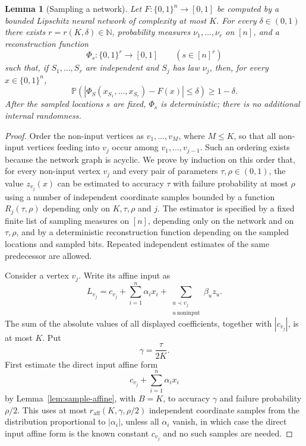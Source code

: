 \documentclass[11pt]{amsart}
\newtheorem{lemma}[theorem]{Lemma}
\newcommand{\Pp}{\mathbb P}
\newcommand{\N}{\mathbb N}
\newcommand{\1}{\mathbf 1}
\newcommand{\cube}{\{0,1\}}
\newcommand{\abs}[1]{\left\lvert #1\right\rvert}
\begin{document}
\begin{lemma}[Sampling a network]\label{lem:sample-network}
Let $F:\cube^n\to[0,1]$ be computed by a bounded Lipschitz neural network of complexity at most $K$.  For every $\delta\in(0,1)$ there exists $r=r(K,\delta)\in\N$, probability measures $\nu_1,\ldots,\nu_r$ on $[n]$, and a reconstruction function
\[
        \Phi_s:\cube^r\to[0,1]\qquad (s\in[n]^r)
\]
such that, if $S_1,\ldots,S_r$ are independent and $S_j$ has law $\nu_j$, then, for every $x\in\cube^n$,
\[
        \Pp\left(\abs{\Phi_S(x_{S_1},\ldots,x_{S_r})-F(x)}\leq\delta\right)\geq1-\delta .
\]
After the sampled locations $s$ are fixed, $\Phi_s$ is deterministic; there is no additional internal randomness.
\end{lemma}

\begin{proof}
Order the non-input vertices as \(v_1,\ldots,v_M\), where \(M\leq K\), so that
all non-input vertices feeding into \(v_j\) occur among
\(v_1,\ldots,v_{j-1}\).  Such an ordering exists because the network graph is
acyclic. We prove by induction on this order that, for every non-input vertex $v_j$ and every pair of parameters $\tau,\rho\in(0,1)$, the value $z_{v_j}(x)$ can be estimated to accuracy $\tau$ with failure probability at most $\rho$ using a number of independent coordinate samples bounded by a function $R_j(\tau,\rho)$ depending only on $K,\tau,\rho$ and $j$.  The estimator is specified by a fixed finite list of sampling measures on $[n]$, depending only on the network and on $\tau,\rho$, and by a deterministic reconstruction function depending on the sampled locations and sampled bits.  Repeated independent estimates of the same predecessor are allowed. 

Consider a vertex $v_j$.  Write its affine input as
\[
        L_{v_j}=c_{v_j}+\sum_{i=1}^n \alpha_i x_i+\sum_{\substack{u\prec v_j\\ u\ \mathrm{noninput}}} \beta_u z_u .
\]
The sum of the absolute values of all displayed coefficients, together with $\abs{c_{v_j}}$, is at most $K$.  Put
\[
        \gamma=\frac{\tau}{2K}.
\]
First estimate the direct input affine form
\[
        c_{v_j}+\sum_{i=1}^n \alpha_i x_i
\]
by Lemma~\ref{lem:sample-affine}, with $B=K$, to accuracy $\gamma$ and failure probability $\rho/2$.  This uses at most $r_{\mathrm{aff}}(K,\gamma,\rho/2)$ independent coordinate samples from the distribution proportional to $\abs{\alpha_i}$, unless all $\alpha_i$ vanish, in which case the direct input affine form is the known constant $c_{v_j}$ and no such samples are needed.


\end{proof}
\end{document}
